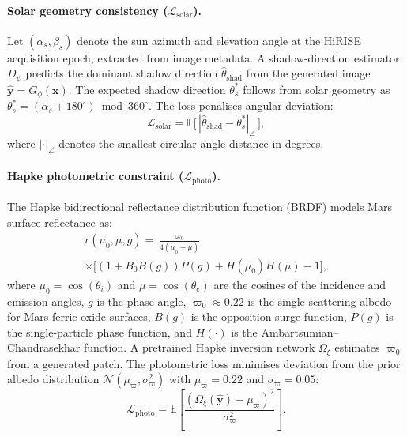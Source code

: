 \documentclass[10pt,journal]{IEEEtran}
\begin{document}
\paragraph{Solar geometry consistency ($\mathcal{L}_{\mathrm{solar}}$).}
Let $(\alpha_s, \beta_s)$ denote the sun azimuth and elevation angle at the
HiRISE acquisition epoch, extracted from image metadata. A shadow-direction
estimator $D_\psi$ predicts the dominant shadow direction
$\hat{\theta}_{\mathrm{shad}}$ from the generated image
$\hat{\mathbf{y}} = G_\phi(\mathbf{x})$. The expected shadow direction
$\theta_s^*$ follows from solar geometry as
$\theta_s^* = (\alpha_s + 180^{\circ}) \bmod 360^{\circ}$. The loss penalises
angular deviation:
\begin{equation}
  \mathcal{L}_{\mathrm{solar}} =
    \mathbb{E}\bigl[\,|\hat{\theta}_{\mathrm{shad}}
    - \theta_s^*|_{\angle}\,\bigr],
  \label{eq:l_solar}
\end{equation}
where $|\cdot|_{\angle}$ denotes the smallest circular angle distance in degrees.

\paragraph{Hapke photometric constraint ($\mathcal{L}_{\mathrm{photo}}$).}
The Hapke bidirectional reflectance distribution function (BRDF)
\cite{hapke2012theory} models Mars surface reflectance as:
\begin{multline}
  r(\mu_0, \mu, g) = \frac{\varpi_0}{4(\mu_0 + \mu)} \\
    \times \bigl[(1 + B_0 B(g)) P(g) + H(\mu_0) H(\mu) - 1\bigr],
  \label{eq:hapke}
\end{multline}
where $\mu_0 = \cos(\theta_i)$ and $\mu = \cos(\theta_e)$ are the cosines of
the incidence and emission angles, $g$ is the phase angle,
$\varpi_0 \approx 0.22$ is the single-scattering albedo for Mars ferric oxide
surfaces, $B(g)$ is the opposition surge function, $P(g)$ is the single-particle
phase function, and $H(\cdot)$ is the Ambartsumian--Chandrasekhar function. A
pretrained Hapke inversion network $\Omega_\xi$ estimates $\varpi_0$ from a
generated patch. The photometric loss minimises deviation from the prior
albedo distribution $\mathcal{N}(\mu_{\varpi}, \sigma_{\varpi}^2)$ with
$\mu_{\varpi} = 0.22$ and $\sigma_{\varpi} = 0.05$:
\begin{equation}
  \mathcal{L}_{\mathrm{photo}} =
    \mathbb{E}\left[\frac{(\Omega_\xi(\hat{\mathbf{y}}) - \mu_{\varpi})^2}
    {\sigma_{\varpi}^2}\right].
  \label{eq:l_photo}
\end{equation}
\end{document}
